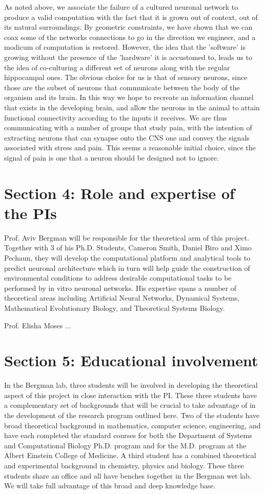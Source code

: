 As noted above, we associate the failure of a cultured neuronal network to produce a valid computation with the fact that it is grown out of context, out of its natural surroundings. By geometric constraints, we have shown that we can coax some of the networks connections to go in the direction we engineer, and a modicum of computation is restored. However, the idea that the 'software' is growing without the presence of the 'hardware' it is accustomed to, leads us to the idea of co-culturing a different set of neurons along with the regular hippocampal ones. The obvious choice for us is that of sensory neurons, since those are the subset of neurons that communicate between the body of the organism and its brain. In this way we hope to recreate an information channel that exists in the developing brain, and allow the neurons in the animal to attain functional connectivity according to the inputs it receives. 
We are thus communicating with a number of groups that study pain, with the intention of extracting neurons that can synapse onto the CNS one and convey the signals associated with stress and pain. This seems a reasonable initial choice, since the signal of pain is one that a neuron should be designed not to ignore.

\section{Section 4: Role and expertise of the PIs}

Prof. Aviv Bergman will be responsible for the theoretical arm of this project. Together with 3 of his Ph.D. Students, Cameron Smith, Daniel Biro and Ximo Pechaun, they will develop the computational platform and analytical tools to predict neuronal architecture which in turn will help guide the construction of environmental conditions to address desirable computational tasks to be performed by in vitro neuronal networks. His expertise spans a number of theoretical areas including Artificial Neural Networks, Dynamical Systems, Mathematical Evolutionary Biology, and Theoretical Systems Biology.

Prof. Elisha Moses ...

\section{Section 5: Educational involvement}
In the Bergman lab, three students will be involved in developing the theoretical aspect of this project in close interaction with the PI. These three students have a complementary set of backgrounds that will be crucial to take advantage of in the development of the research program outlined here. Two of the students have broad theoretical background in mathematics, computer science, engineering, and have each completed the standard courses for both the  Department of Systems and Computational Biology Ph.D. program and for the M.D. program at the Albert Einstein College of Medicine. A third student has a combined theoretical and experimental background in chemistry, physics and biology. These three students share an office and all have benches together in the Bergman wet lab. We will take full advantage of this broad and deep knowledge base.

